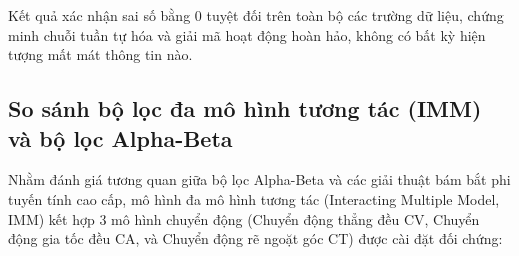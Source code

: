 \begin{table}[H]
\centering
\caption{Kiểm tra tính toàn vẹn dữ liệu tọa độ qua chuỗi truyền thông thời gian thực}
\label{tab:w14-integrity}
\end{table}

Kết quả xác nhận sai số bằng 0 tuyệt đối trên toàn bộ các trường dữ liệu, chứng minh chuỗi tuần tự hóa và giải mã hoạt động hoàn hảo, không có bất kỳ hiện tượng mất mát thông tin nào.

\subsection{So sánh bộ lọc đa mô hình tương tác (IMM) và bộ lọc Alpha-Beta}

\hspace{0.5cm} Nhằm đánh giá tương quan giữa bộ lọc Alpha-Beta và các giải thuật bám bắt phi tuyến tính cao cấp, mô hình đa mô hình tương tác (Interacting Multiple Model, IMM) kết hợp 3 mô hình chuyển động (Chuyển động thẳng đều CV, Chuyển động gia tốc đều CA, và Chuyển động rẽ ngoặt góc CT) được cài đặt đối chứng:

